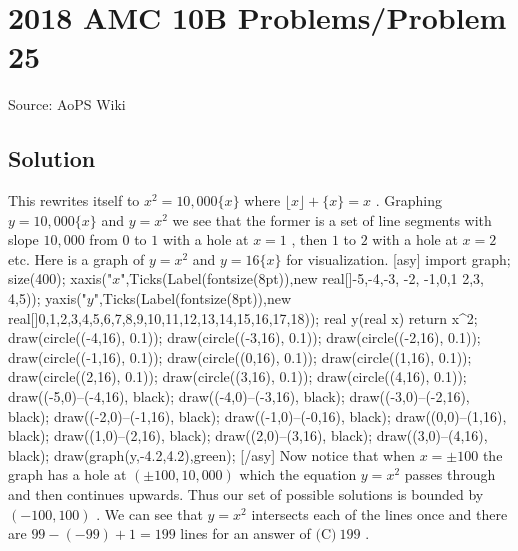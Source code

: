 \documentclass[12pt]{article}
\begin{document}
\section*{{2018 AMC 10B Problems/Problem 25}}
Source: AoPS Wiki

\subsection*{Solution}
This rewrites itself to $x^2=10,000\{x\}$ where $\lfloor x \rfloor + \{x\} = x$ . Graphing $y=10,000\{x\}$ and $y=x^2$ we see that the former is a set of line segments with slope $10,000$ from $0$ to $1$ with a hole at $x=1$ , then $1$ to $2$ with a hole at $x=2$ etc.
Here is a graph of $y=x^2$ and $y=16\{x\}$ for visualization. [asy] import graph; size(400); xaxis("$x$",Ticks(Label(fontsize(8pt)),new real[]{-5,-4,-3, -2, -1,0,1 2,3, 4,5})); yaxis("$y$",Ticks(Label(fontsize(8pt)),new real[]{0,1,2,3,4,5,6,7,8,9,10,11,12,13,14,15,16,17,18})); real y(real x) {return x^2;} draw(circle((-4,16), 0.1)); draw(circle((-3,16), 0.1)); draw(circle((-2,16), 0.1)); draw(circle((-1,16), 0.1)); draw(circle((0,16), 0.1)); draw(circle((1,16), 0.1)); draw(circle((2,16), 0.1)); draw(circle((3,16), 0.1)); draw(circle((4,16), 0.1)); draw((-5,0)--(-4,16), black); draw((-4,0)--(-3,16), black); draw((-3,0)--(-2,16), black); draw((-2,0)--(-1,16), black); draw((-1,0)--(-0,16), black); draw((0,0)--(1,16), black); draw((1,0)--(2,16), black); draw((2,0)--(3,16), black); draw((3,0)--(4,16), black); draw(graph(y,-4.2,4.2),green); [/asy] Now notice that when $x=\pm 100$ the graph has a hole at $(\pm 100,10,000)$ which the equation $y=x^2$ passes through and then continues upwards. Thus our set of possible solutions is bounded by $(-100,100)$ . We can see that $y=x^2$ intersects each of the lines once and there are $99-(-99)+1=199$ lines for an answer of $\boxed{\text{(C)}~199}$ .
\end{document}
